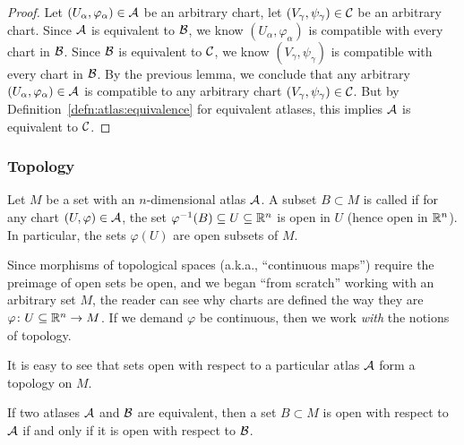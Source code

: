 \begin{proof}
Let $(U_{\alpha},\varphi_{\alpha})\in\mathcal{A}$ be an arbitrary chart,
let $(V_{\gamma},\psi_{\gamma})\in\mathcal{C}$ be an arbitrary chart. 
Since $\mathcal{A}$ is equivalent to $\mathcal{B}$, we know
$(U_{\alpha},\varphi_{\alpha})$ is compatible with every chart in $\mathcal{B}$.
Since $\mathcal{B}$ is equivalent to $\mathcal{C}$, we know
$(V_{\gamma},\psi_{\gamma})$ is compatible with every chart in $\mathcal{B}$.
By the previous lemma, we conclude that any arbitrary
$(U_{\alpha},\varphi_{\alpha})\in\mathcal{A}$ is compatible to any arbitrary
chart $(V_{\gamma},\psi_{\gamma})\in\mathcal{C}$. But by Definition~\ref{defn:atlas:equivalence} for
equivalent atlases, this implies $\mathcal{A}$ is equivalent to $\mathcal{C}$.
\end{proof}

\subsubsection{Topology}

\begin{definition}
Let $M$ be a set with an $n$-dimensional atlas $\mathcal{A}$. A subset
$B\subset M$
is called  if for any chart
$(U,\varphi)\in\mathcal{A}$, the set $\varphi^{-1}(B)\subseteq U\subseteq\mathbb{R}^{n}$
is open in $U$ (hence open in $\mathbb{R}^{n}$).
In particular, the sets $\varphi(U)$ are open subsets of $M$.
\end{definition}

\begin{remark}
Since morphisms of topological spaces (a.k.a., ``continuous maps'')
require the preimage of open sets be open, and we began ``from scratch''
working with an arbitrary set $M$, the reader can see why charts are
defined the way they are $\varphi\colon U\subseteq\mathbb{R}^{n}\to M$. If we
demand $\varphi$ be continuous, then we work \emph{with} the notions of
topology. 
\end{remark}

\begin{remark}
It is easy to see that sets open with respect to a particular atlas
$\mathcal{A}$ form a topology on $M$.
\end{remark}

\begin{proposition}
If two atlases $\mathcal{A}$ and $\mathcal{B}$ are equivalent, then a set
$B\subset M$ is open with respect to $\mathcal{A}$ if and only if it is
open with respect to $\mathcal{B}$.
\end{proposition}

